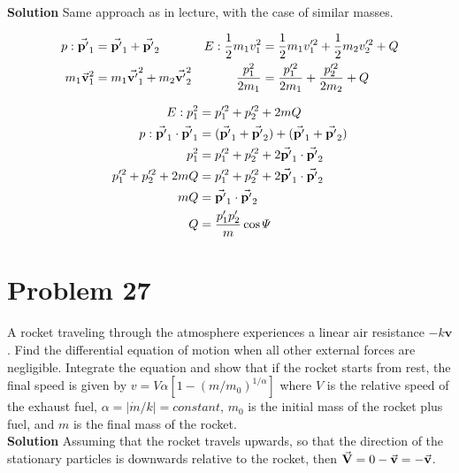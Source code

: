 \documentclass[]{article}
\newcommand{\bd}{\textbf}
\begin{document}
	\bd{Solution} Same approach as in lecture, with the case of similar masses.
	
	\begin{equation}
		\begin{aligned}
			p: \va{p'}_1 &= \va{p'}_1 + \va{p'}_2 & E: \frac{1}{2}m_1 v^2_1 &= \frac{1}{2}m_1 v'^2_1 + \frac{1}{2}m_2 v'^2_2 + Q \\
			m_1 \va{v}^2_1 &= m_1 \va{v'}^2_1 + m_2 \va{v'}^2_2 & \frac{p^2_1}{2m_1} &= \frac{p'^2_1}{2m_1} + \frac{p'^2_2}{2m_2} + Q \\
		\end{aligned}
	\end{equation}

	\begin{equation}
		\begin{split}
			E: p^2_1 &= p'^2_1 + p'^2_2 + 2mQ \\
			p: \va{p'}_1 \cdot \va{p'}_1 &= (\va{p'}_1 + \va{p'}_2) + (\va{p'}_1 + \va{p'}_2) \\
			p^2_1 &= p'^2_1 + p'^2_2 + 2\va{p'}_1 \cdot \va{p'}_2 \\
			p'^2_1 + p'^2_2 + 2mQ &= p'^2_1 + p'^2_2 + 2\va{p'}_1 \cdot \va{p'}_2 \\
			mQ &= \va{p'}_1 \cdot \va{p'}_2 \\
			Q &= \frac{p'_1 p'_2}{m}\cos \varPsi \\
		\end{split}
	\end{equation}
	\section{Problem 27}
	
	A rocket traveling through the atmosphere experiences a linear air resistance $-k\bd{v}$. Find the differential equation of motion when all other external forces are negligible. Integrate the equation and show that if the rocket starts from rest, the final speed is given by $ v = V\alpha\left[ 1 - (m/m_0)^{1/\alpha} \right] $ where $V$ is the relative speed of the exhaust fuel, $\alpha = \left| \dot{m}/k \right| = constant$, $m_0$ is the initial mass of the rocket plus fuel, and $m$ is the final mass of the rocket. \\
	
	\bd{Solution} Assuming that the rocket travels upwards, so that the direction of the stationary particles is downwards relative to the rocket, then $ \va{V} = 0 - \va{v} = -\va{v} $.
	
\end{document}
